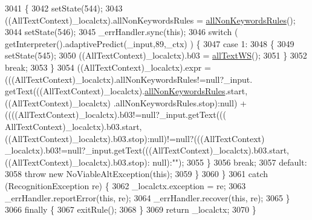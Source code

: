 \begin{DoxyCode}
3041         \{
3042         setState(544);
3043         ((AllTextContext)\_localctx).allNonKeywordsRules = \hyperlink{classgov_1_1nasa_1_1jpf_1_1inspector_1_1client_1_1parser_1_1_console_grammar_parser_a2849ff1ee2341a3450b6fbdbe326336d}{allNonKeywordsRules}();
3044         setState(546);
3045         \_errHandler.sync(\textcolor{keyword}{this});
3046         \textcolor{keywordflow}{switch} ( getInterpreter().adaptivePredict(\_input,89,\_ctx) ) \{
3047         \textcolor{keywordflow}{case} 1:
3048           \{
3049           setState(545);
3050           ((AllTextContext)\_localctx).b03 = \hyperlink{classgov_1_1nasa_1_1jpf_1_1inspector_1_1client_1_1parser_1_1_console_grammar_parser_adc161fc81eedd939154fd25e889f5b28}{allTextWS}();
3051           \}
3052           \textcolor{keywordflow}{break};
3053         \}
3054          ((AllTextContext)\_localctx).expr =  (((AllTextContext)\_localctx).allNonKeywordsRules!=null?\_input.
      getText(((AllTextContext)\_localctx).\hyperlink{classgov_1_1nasa_1_1jpf_1_1inspector_1_1client_1_1parser_1_1_console_grammar_parser_a2849ff1ee2341a3450b6fbdbe326336d}{allNonKeywordsRules}.start,((AllTextContext)\_localctx)
      .allNonKeywordsRules.stop):null) +                ((((AllTextContext)\_localctx).b03!=null?\_input.getText(((
      AllTextContext)\_localctx).b03.start,((AllTextContext)\_localctx).b03.stop):null)!=null?(((AllTextContext)
      \_localctx).b03!=null?\_input.getText(((AllTextContext)\_localctx).b03.start,((AllTextContext)\_localctx).b03.stop):
      null):\textcolor{stringliteral}{""}); 
3055         \}
3056         \textcolor{keywordflow}{break};
3057       \textcolor{keywordflow}{default}:
3058         \textcolor{keywordflow}{throw} \textcolor{keyword}{new} NoViableAltException(\textcolor{keyword}{this});
3059       \}
3060     \}
3061     \textcolor{keywordflow}{catch} (RecognitionException re) \{
3062       \_localctx.exception = re;
3063       \_errHandler.reportError(\textcolor{keyword}{this}, re);
3064       \_errHandler.recover(\textcolor{keyword}{this}, re);
3065     \}
3066     \textcolor{keywordflow}{finally} \{
3067       exitRule();
3068     \}
3069     \textcolor{keywordflow}{return} \_localctx;
3070   \}
\end{DoxyCode}
